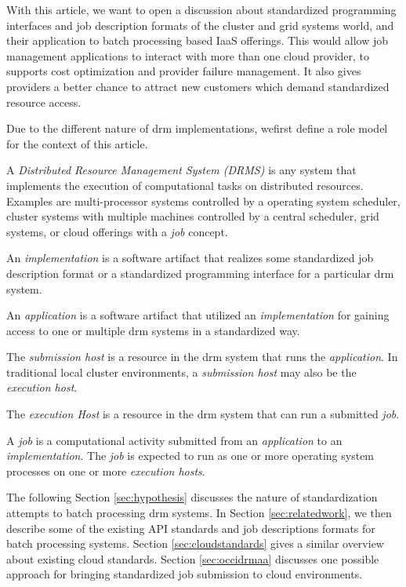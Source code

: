 \documentclass[twocolumn]{svjour3}       %
\begin{document}
With this article, we want to open a discussion about standardized programming interfaces and job description formats of the cluster and grid systems world, and their application to batch processing based IaaS offerings. This would allow job management applications to interact with more than one cloud provider, to supports cost optimization and provider failure management. It also gives providers a better chance to attract new customers which demand standardized resource access.

\label{sec:rolemodel}

Due to the different nature of \gls{drm} implementations, wefirst define a role model for the context of this article.

A \emph{Distributed Resource Management System (DRMS)} is any system that implements the execution of computational tasks on distributed resources. Examples are multi-processor systems controlled by a operating system scheduler, cluster systems with multiple machines controlled by a central scheduler, grid systems, or cloud offerings with a \emph{job} concept.

An \emph{implementation} is a software artifact that realizes some standardized job description format or a standardized programming interface for a particular \gls{drm} system.

An \emph{application} is a software artifact that utilized an \emph{implementation} for gaining access to one or multiple \gls{drm} systems in a standardized way.

The \emph{submission host} is a resource in the \gls{drm} system that runs the \emph{application}. In traditional local cluster environments, a \emph{submission host} may also be the \emph{execution host}.

The \emph{execution Host} is a resource in the \gls{drm} system that can run a submitted \emph{job}.

A \emph{job} is a computational activity submitted from an \emph{application} to an \emph{implementation}. The \emph{job} is expected to run as one or more operating system processes on one or more \emph{execution hosts}.

The following Section \ref{sec:hypothesis} discusses the nature of standardization attempts to batch processing \gls{drm} systems.  In Section \ref{sec:relatedwork}, we then describe some of the existing API standards and job descriptions formats for batch processing systems. Section \ref{sec:cloudstandards} gives a similar overview about existing cloud standards. Section \ref{sec:occidrmaa} discusses one possible approach for bringing standardized job submission to cloud environments. 
\end{document}
